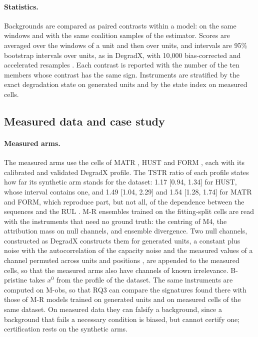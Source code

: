 \documentclass{article}
\begin{document}
\paragraph{Statistics.} Backgrounds are compared as paired contrasts within a model: on the same windows and with the same coalition samples of the estimator. Scores are averaged over the windows of a unit and then over units, and intervals are 95\% bootstrap intervals over units, as in DegradX, with 10{,}000 bias-corrected and accelerated resamples \citep{degradx2026, degradxrepo}. Each contrast is reported with the number of the ten members whose contrast has the same sign. Instruments are stratified by the exact degradation state on generated units and by the state index on measured cells.

\subsection{Measured data and case study}\label{sec:method:measured}

\paragraph{Measured arms.} The measured arms use the cells of MATR \citep{severson2019data}, HUST \citep{ma2022real} and FORM \citep{cui2024data}, each with its calibrated and validated DegradX profile. The TSTR ratio of each profile states how far its synthetic arm stands for the dataset: 1.17 [0.94, 1.34] for HUST, whose interval contains one, and 1.49 [1.04, 2.29] and 1.54 [1.28, 1.74] for MATR and FORM, which reproduce part, but not all, of the dependence between the sequences and the RUL \citep{degradx2026}. M-R ensembles trained on the fitting-split cells are read with the instruments that need no ground truth: the centring of M4, the attribution mass on null channels, and ensemble divergence. Two null channels, constructed as DegradX constructs them for generated units, a constant plus noise with the autocorrelation of the capacity noise and the measured values of a channel permuted across units and positions \citep{degradx2026}, are appended to the measured cells, so that the measured arms also have channels of known irrelevance. B-pristine takes $x^0$ from the profile of the dataset. The same instruments are computed on M-obs, so that RQ3 can compare the signatures found there with those of M-R models trained on generated units and on measured cells of the same dataset. On measured data they can falsify a background, since a background that fails a necessary condition is biased, but cannot certify one; certification rests on the synthetic arms.
\end{document}
